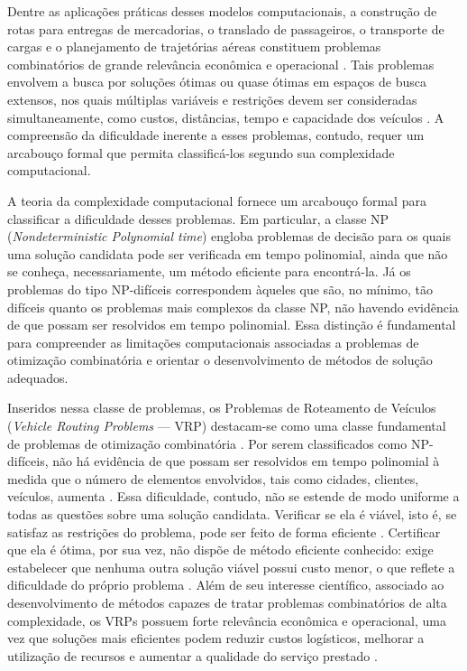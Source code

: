 Dentre as aplicações práticas desses modelos computacionais, a construção de rotas para entregas de mercadorias, o translado de passageiros, o transporte de cargas e o planejamento de trajetórias aéreas constituem problemas combinatórios de grande relevância econômica e operacional \cite{toth2002vehicle}. Tais problemas envolvem a busca por soluções ótimas ou quase ótimas em espaços de busca extensos, nos quais múltiplas variáveis e restrições devem ser consideradas simultaneamente, como custos, distâncias, tempo e capacidade dos veículos \cite{braekers2016vehicle}. A compreensão da dificuldade inerente a esses problemas, contudo, requer um arcabouço formal que permita classificá-los segundo sua complexidade computacional.

A teoria da complexidade computacional fornece um arcabouço formal para classificar a dificuldade desses problemas. Em particular, a classe NP (\textit{Nondeterministic Polynomial time}) engloba problemas de decisão para os quais uma solução candidata pode ser verificada em tempo polinomial, ainda que não se conheça, necessariamente, um método eficiente para encontrá-la. Já os problemas do tipo NP-difíceis correspondem àqueles que são, no mínimo, tão difíceis quanto os problemas mais complexos da classe NP, não havendo evidência de que possam ser resolvidos em tempo polinomial. Essa distinção é fundamental para compreender as limitações computacionais associadas a problemas de otimização combinatória e orientar o desenvolvimento de métodos de solução adequados. \cite{sipser1996introduction}

Inseridos nessa classe de problemas, os Problemas de Roteamento de Veículos (\textit{Vehicle Routing Problems} — VRP) destacam-se como uma classe fundamental de problemas de otimização combinatória \cite{psaraftis1995dynamic, laporte1992vehicle, Heidelberg2008travelingsalesmanperson}. Por serem classificados como NP-difíceis, não há evidência de que possam ser resolvidos em tempo polinomial à medida que o número de elementos envolvidos, tais como cidades, clientes, veículos, aumenta \cite{karp2009reducibility}. Essa dificuldade, contudo, não se estende de modo uniforme a todas as questões sobre uma solução candidata. Verificar se ela é viável, isto é, se satisfaz as restrições do problema, pode ser feito de forma eficiente \cite{sipser1996introduction, lenstra1981complexity}. Certificar que ela é ótima, por sua vez, não dispõe de método eficiente conhecido: exige estabelecer que nenhuma outra solução viável possui custo menor, o que reflete a dificuldade do próprio problema \cite{garey1990guide, papadimitriou1998combinatorial}. Além de seu interesse científico, associado ao desenvolvimento de métodos capazes de tratar problemas combinatórios de alta complexidade, os VRPs possuem forte relevância econômica e operacional, uma vez que soluções mais eficientes podem reduzir custos logísticos, melhorar a utilização de recursos e aumentar a qualidade do serviço prestado \cite{dantzig1959truck, toth2002vehicle}.

